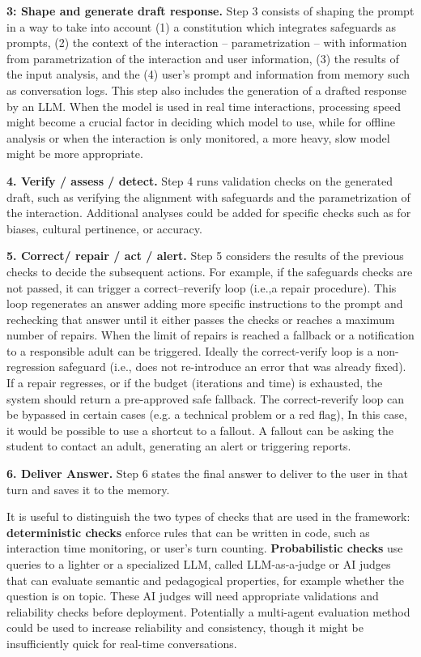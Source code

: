 \documentclass[fleqn,10pt]{wlscirep}
\begin{document}
\textbf{3: Shape and generate draft response.} Step 3 consists of shaping the prompt in a way to take into account (1) a constitution which integrates safeguards as prompts, (2) the context of the interaction -- parametrization -- with information from parametrization of the interaction and user information, (3) the results of the input analysis, and the (4) user's prompt and information from memory such as conversation logs. This step also includes the generation of a drafted response by an LLM. When the model is used in real time interactions, processing speed might become a crucial factor in deciding which model to use, while for offline analysis or when the interaction is only monitored, a more heavy, slow model might be more appropriate.

\textbf{4. Verify / assess / detect.} Step 4 runs validation checks on the generated draft, such as verifying the alignment with safeguards and the parametrization of the interaction. Additional analyses could be added for specific checks such as for biases, cultural pertinence, or accuracy.

\textbf{5. Correct/ repair / act / alert.} Step 5 considers the results of the previous checks to decide the subsequent actions. For example, if the safeguards checks are not passed, it can trigger a correct--reverify loop (i.e.,a repair procedure). This loop regenerates an answer adding more specific instructions to the prompt and rechecking that answer until it either passes the checks or reaches a maximum number of repairs. When the limit of repairs is reached a fallback or a notification to a responsible adult can be triggered. Ideally the correct-verify loop is a non-regression safeguard (i.e., does not re-introduce an error that was already fixed). If a repair regresses, or if the budget (iterations and time) is exhausted, the system should return a pre-approved safe fallback. The correct-reverify loop can be bypassed in certain cases (e.g. a technical problem or a red flag), In this case, it would be possible to use a shortcut to a fallout. A fallout can be asking the student to contact an adult, generating an alert or triggering reports.

\textbf{6. Deliver Answer.} Step 6 states the final answer to deliver to the user in that turn and saves it to the memory.

It is useful to distinguish the two types of checks that are used in the framework: \textbf{deterministic checks} enforce rules that can be written in code, such as interaction time monitoring, or user's turn counting. \textbf{Probabilistic checks} use queries to a lighter or a specialized LLM, called LLM‑as‑a‑judge or AI judges \cite{Baysan2025, Gu2026} that can evaluate semantic and pedagogical properties, for example whether the question is on topic. These AI judges will need appropriate validations and reliability checks before deployment. Potentially a multi-agent evaluation method could be used to increase reliability and consistency, though it might be insufficiently quick for real-time conversations.
\end{document}
